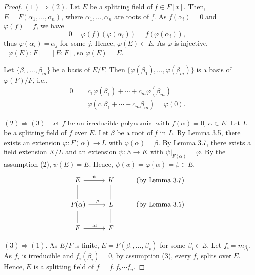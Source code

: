 \documentclass[twoside]{article}
\DeclareMathOperator\id{id}
\theoremstyle{remark}
\begin{document}
\begin{proof}
  \((1) \Rightarrow (2)\). Let \(E\) be a splitting field of \(f \in F[x]\). Then, \(E = F(\alpha_1, \dots, \alpha_n)\), where \(\alpha_1, \dots, \alpha_n\) are roots of \(f\). As \(f(\alpha_i) = 0\) and \(\varphi(f) = f\), we have
  \[ 0 = \varphi(f) (\varphi(\alpha_i)) = f(\varphi(\alpha_i)), \]
  thus \(\varphi(\alpha_i) = \alpha_j\) for some \(j\). Hence, \(\varphi(E) \subset E\). As \(\varphi\) is injective, \([\varphi(E):F] = [E:F]\), so \(\varphi(E) = E\).
  
  Let \(\{\beta_1, \dots, \beta_m\}\) be a basis of \(E/F\). Then \(\{\varphi(\beta_1), \dots, \varphi(\beta_m)\}\) is a basis of \(\varphi(F)/F\), i.e.,
  \begin{align*}
    0 & = c_1 \varphi(\beta_1) + \cdots + c_m \varphi(\beta_m) \\
    & = \varphi(c_1 \beta_1 + \cdots + c_m \beta_m) = \varphi(0).
  \end{align*}
  
  \smallskip
  
  \((2) \Rightarrow (3)\). Let \(f\) be an irreducible polynomial with \(f(\alpha) = 0\), \(\alpha \in E\). Let \(L\) be a splitting field of \(f\) over \(E\). Let \(\beta\) be a root of \(f\) in \(L\). By Lemma 3.5, there exists an extension \(\varphi\colon F(\alpha) \to L\) with \(\varphi(\alpha) = \beta\). By Lemma 3.7, there exists a field extension \(K/L\) and an extension \(\psi\colon E \to K\) with \(\psi|_{F(\alpha)} = \varphi\). By the assumption (2), \(\psi(E) = E\). Hence, \(\psi(\alpha) = \varphi(\alpha) = \beta \in E\).
  \begin{displaymath}
    \begin{tikzcd}
      E\rar["\psi"]\dar[dash] & K\dar[dash] & \text{(by Lemma 3.7)} \\
      F(\alpha)\rar["\varphi"]\dar[dash] & L\dar[dash] & \text{(by Lemma 3.5)} \\
      F\rar["\id"] & F
    \end{tikzcd}
  \end{displaymath}
  
  \smallskip
  
  \((3) \Rightarrow (1)\). As \(E/F\) is finite, \(E=F(\beta_1, \dots, \beta_n)\) for some \(\beta_i \in E\). Let \(f_i = m_{\beta_i}\). As \(f_i\) is irreducible and \(f_i(\beta_i) = 0\), by assumption (3), every \(f_i\) splits over \(E\). Hence, \(E\) is a splitting field of \(f\coloneq f_1 f_2 \cdots f_n\).
\end{proof}
\end{document}

